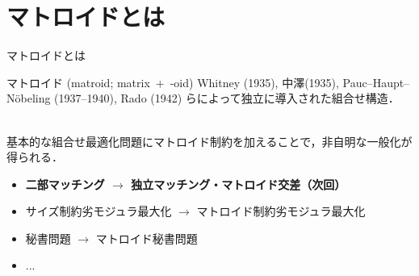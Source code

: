 \documentclass[14pt,aspectratio=169,xcolor=dvipsnames,table,onlytextwidth,dvipdfmx]{beamer}
\begin{document}
\section{マトロイドとは}

\begin{frame}{マトロイドとは}
    \small

    \begin{block}{マトロイド (matroid; matrix~+~-oid)}
    Whitney (1935), 中澤(1935), Pauc--Haupt--N\"obeling (1937--1940), Rado (1942) らによって独立に導入された組合せ構造．
    \end{block}

    \vfill
    \\
    基本的な組合せ最適化問題にマトロイド制約を加えることで，非自明な一般化が得られる．
    \begin{itemize}
        \item \textbf{二部マッチング $\longrightarrow$ 独立マッチング・マトロイド交差（次回）}
        \item サイズ制約劣モジュラ最大化 $\longrightarrow$ マトロイド制約劣モジュラ最大化
        \item 秘書問題 $\longrightarrow$ マトロイド秘書問題
        \item[] ...
    \end{itemize}
\end{frame}
\end{document}
